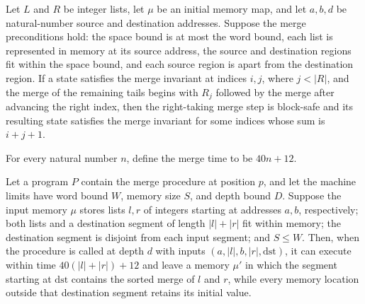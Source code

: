 \begin{theorem}
\label{Light.Merge.takeRight}
\leanok
{}
Let $L$ and $R$ be integer lists, let $\mu$ be an initial memory map, and let $a,b,d$ be
natural-number source and destination addresses. Suppose the merge preconditions hold:
the space bound is at most the word bound, each list is represented in memory at its
source address, the source and destination regions fit within the space bound, and each
source region is apart from the destination region. If a state satisfies the merge
invariant at indices $i,j$, where $j<|R|$, and the merge of the remaining tails begins
with $R_j$ followed by the merge after advancing the right index, then the right-taking
merge step is block-safe and its resulting state satisfies the merge invariant for some
indices whose sum is $i+j+1$.
\end{theorem}

\begin{definition}
\label{Light.mergeTime}
\leanok
For every natural number $n$, define the merge time to be $40n+12$.
\end{definition}

\begin{theorem}
\label{Light.merge_meets}
\leanok
{}
Let a program $P$ contain the merge procedure at position $p$, and let the machine
limits have word bound $W$, memory size $S$, and depth bound $D$. Suppose the input
memory $\mu$ stores lists $l,r$ of integers starting at addresses $a,b$, respectively;
both lists and a destination segment of length $|l|+|r|$ fit within memory; the
destination segment is disjoint from each input segment; and $S\le W$. Then, when the
procedure is called at depth $d$ with inputs $(a,|l|,b,|r|,\mathrm{dst})$, it can
execute within time $40(|l|+|r|)+12$ and leave a memory $\mu'$ in which the segment
starting at $\mathrm{dst}$ contains the sorted merge of $l$ and $r$, while every memory
location outside that destination segment retains its initial value.
\end{theorem}
